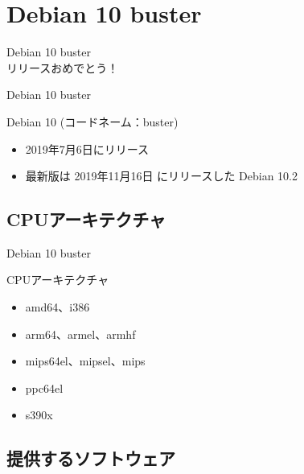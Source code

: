 
\section{Debian 10 buster}

\begin{frame}
  \begin{center}\Huge{Debian 10 buster\\リリースおめでとう！}\end{center}
\end{frame}


\begin{frame}{Debian 10 buster}%

Debian 10 (コードネーム：buster)

\begin{itemize}
\item 2019年7月6日にリリース
\item 最新版は 2019年11月16日 にリリースした Debian 10.2
\end{itemize}


\end{frame}


\subsection{CPUアーキテクチャ}

\begin{frame}{Debian 10 buster}%

CPUアーキテクチャ

\begin{itemize}
\item amd64、i386
\item arm64、armel、armhf
\item mips64el、mipsel、mips
\item ppc64el
\item s390x
\end{itemize}
    
\end{frame}


\subsection{提供するソフトウェア}

